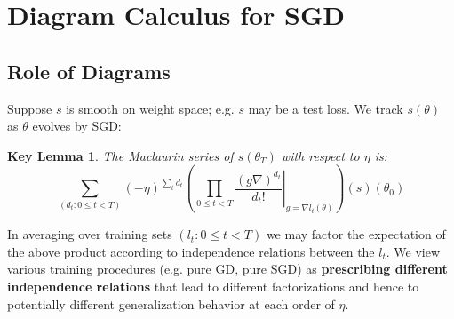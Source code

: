 \documentclass{article}
\newtheorem{klem}{Key Lemma}
\begin{document}

\section{Diagram Calculus for SGD}
\subsection{Role of Diagrams}
    Suppose $s$ is smooth on weight space; e.g. $s$ may be a test
    loss.  We track $s(\theta)$ as $\theta$ evolves by SGD:
    \begin{klem}
        The Maclaurin series of $s(\theta_T)$ with respect to $\eta$ is:
        \begin{equation}\label{eq:dyson}
            \sum_{(d_t: 0\leq t<T)}
            (-\eta)^{\sum_t d_t}
            \left(
                \prod_{0 \leq t < T}
                    \left.  \frac{(g \nabla)^{d_t}}{d_t!} \right|_{g=\nabla l_t(\theta)}
            \right)
            (s) (\theta_0)
        \end{equation}
    \end{klem}
    In averaging over training sets $(l_t: 0\leq t<T)$ we may factor the
    expectation of the above product according to independence relations
    between the $l_t$.  We view various training procedures (e.g. pure GD, pure
    SGD) as {\bf prescribing different independence relations} that lead to
    different factorizations and hence to potentially different generalization
    behavior at each order of $\eta$.
\end{document}
